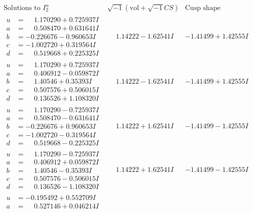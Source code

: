 \documentclass[1p]{elsarticle_modified}
\theoremstyle{definition}
\newcommand{\I}{\sqrt{-1}}
\begin{document}
$$\begin{array}{c|c|c}  
\text{Solutions to }I^u_{2}& \I (\text{vol} + \sqrt{-1}CS) & \text{Cusp shape}\\
 \hline 
\begin{aligned}
u &= \phantom{-}1.170290 + 0.725937 I \\
a &= \phantom{-}0.508470 + 0.631641 I \\
b &= -0.226676 - 0.960653 I \\
c &= -1.002720 + 0.319564 I \\
d &= \phantom{-}0.519668 + 0.225325 I\end{aligned}
 & \phantom{-}1.14222 - 1.62541 I & -1.41499 + 1.42555 I \\ \hline\begin{aligned}
u &= \phantom{-}1.170290 + 0.725937 I \\
a &= \phantom{-}0.406912 - 0.059872 I \\
b &= \phantom{-}1.40546 + 0.35393 I \\
c &= \phantom{-}0.507576 + 0.506015 I \\
d &= \phantom{-}0.136526 + 1.108320 I\end{aligned}
 & \phantom{-}1.14222 - 1.62541 I & -1.41499 + 1.42555 I \\ \hline\begin{aligned}
u &= \phantom{-}1.170290 - 0.725937 I \\
a &= \phantom{-}0.508470 - 0.631641 I \\
b &= -0.226676 + 0.960653 I \\
c &= -1.002720 - 0.319564 I \\
d &= \phantom{-}0.519668 - 0.225325 I\end{aligned}
 & \phantom{-}1.14222 + 1.62541 I & -1.41499 - 1.42555 I \\ \hline\begin{aligned}
u &= \phantom{-}1.170290 - 0.725937 I \\
a &= \phantom{-}0.406912 + 0.059872 I \\
b &= \phantom{-}1.40546 - 0.35393 I \\
c &= \phantom{-}0.507576 - 0.506015 I \\
d &= \phantom{-}0.136526 - 1.108320 I\end{aligned}
 & \phantom{-}1.14222 + 1.62541 I & -1.41499 - 1.42555 I \\ \hline\begin{aligned}
u &= -0.195492 + 0.552709 I \\
a &= \phantom{-}0.527146 + 0.046214 I \\

\end{aligned}
\end{array}$$
\end{document}
